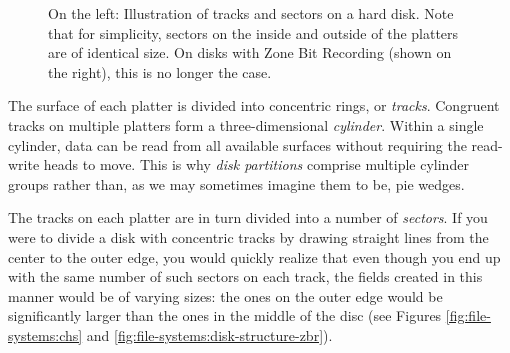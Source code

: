 \begin{figure}[ht]
	\centering
	\hspace{1em}
	\caption[Physical Disk Structure]{On the left: Illustration of tracks and sectors
			on a hard disk.  Note that for simplicity,
			sectors on the inside and outside
			of the platters are of identical size.  On
			disks with Zone Bit Recording
			(shown on the right), this is no longer the case.}
\end{figure}


The surface of each platter is divided into concentric
rings, or {\em tracks}.  Congruent tracks on multiple
platters form a three-dimensional {\em cylinder}.
Within a single cylinder, data can be read from all
available surfaces without requiring the read-write
heads to move.  This is why {\em disk
partitions} comprise multiple
cylinder groups rather than, as
we may sometimes imagine them to be, pie wedges.


The tracks on each platter are in turn divided into a
number of {\em sectors}.  If you were to divide a disk
with concentric tracks by drawing straight lines from
the center to the outer edge, you would quickly
realize that even though you end up with the same
number of such sectors on each track, the fields
created in this manner would be of varying sizes:  the
ones on the outer edge would be significantly larger
than the ones in the middle of the disc (see Figures
\ref{fig:file-systems:chs} and
\ref{fig:file-systems:disk-structure-zbr}).

